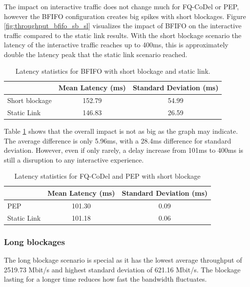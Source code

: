 \documentclass[a4paper,english, 11pt]{report}
\begin{document}
The impact on interactive traffic does not change much for FQ-CoDel or PEP, however the BFIFO configuration creates big spikes with short blockages. Figure \ref{fig:throughput_bfifo_sb_sl} visualizes the impact of BFIFO on the interactive traffic compared to the static link results. With the short blockage scenario the latency of the interactive traffic reaches up to 400ms, this is approximately double the latency peak that the static link scenario reached.\\

\begin{table}[h!]
\centering
\begin{tabular}{l|c|c}
\hline
 & \textbf{Mean Latency (ms)} & \textbf{Standard Deviation (ms)} \\
\hline
Short blockage   & 152.79 & 54.99 \\
Static Link  &  146.83 & 26.59 \\
\end{tabular}
\caption{Latency statistics for BFIFO with short blockage and static link.}
\label{tab:throughput_latency_bfifo_sl_sb}
\end{table}

Table \ref{tab:throughput_latency_bfifo_sl_sb} shows that the overall impact is not as big as the graph may indicate. The average difference is only 5.96ms, with a 28.4ms difference for standard deviation. However, even if only rarely, a delay increase from 101ms to 400ms is still a disruption to any interactive experience.\\

\begin{table}[h!]
\centering
\begin{tabular}{l|c|c}
\hline
 & \textbf{Mean Latency (ms)} & \textbf{Standard Deviation (ms)} \\
\hline
PEP   & 101.30 & 0.09 \\
Static Link  &  101.18 & 0.06 \\
\end{tabular}
\caption{Latency statistics for FQ-CoDel and PEP with short blockage}
\label{tab:throughput_latency_fqcodel_pep_sb}
\end{table}


\subsubsection{Long blockages}
The long blockage scenario is special as it has the lowest average throughput of 2519.73 Mbit/s and highest standard deviation of 621.16 Mbit/s. The blockage lasting for a longer time reduces how fast the bandwidth fluctuates.\\
\end{document}
